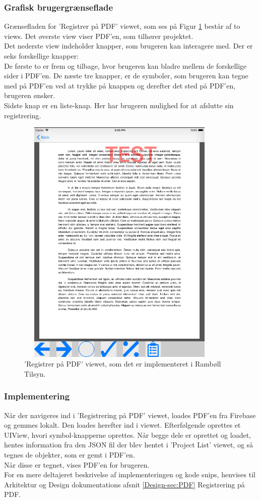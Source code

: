 \subsubsection{Grafisk brugergrænseflade}
Grænsefladen for 'Registrer på PDF' viewet, som ses på Figur \ref{fig:RegistrerObjekterView} består af to views. 
Det øverste view viser PDF'en, som tilhører projektet. \\
Det nederste view indeholder knapper, som brugeren kan interagere med. Der er seks forskellige knapper: \\
De første to er frem og tilbage, hvor brugeren kan bladre mellem de forskellige sider i PDF'en. De næste tre knapper, er de symboler, som brugeren kan tegne med på PDF'en ved at trykke på knappen og derefter det sted på PDF'en, brugeren ønsker. \\
Sidste knap er en liste-knap. Her har brugeren mulighed for at afslutte sin registrering.
\begin{figure}[H] %
	\centering
	\includegraphics[height=12cm, width=10cm]{Design/Applikation/RegistrePDF/PDF}
	\caption{'Registrer på PDF' viewet, som det er implementeret i Rambøll Tilsyn.}
	\label{fig:RegistrerObjekterView}
\end{figure}

\subsubsection{Implementering}
Når der navigeres ind i 'Registrering på PDF' viewet, loades PDF'en fra Firebase og gemmes lokalt. Den loades herefter ind i viewet. Efterfølgende oprettes et UIView, hvori symbol-knapperne oprettes. Når begge dele er oprettet og loadet, hentes information fra den JSON fil der blev hentet i 'Project List' viewet, og så tegnes de objekter, som er gemt i PDF'en. \\
Når disse er tegnet, vises PDF'en for brugeren. \\
For en mere deltajeret beskrivelse af implementeringen og kode snips, henvises til Arkitektur og Design dokumentations afsnit \ref{Design-sec:PDF} Registrering på PDF.


\clearpage